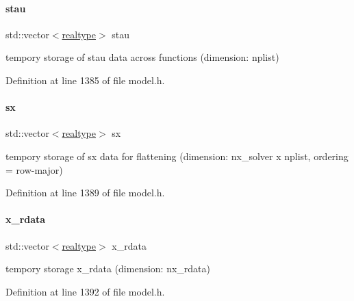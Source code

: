 \paragraph{\texorpdfstring{stau}{stau}}
{\footnotesize\ttfamily std\+::vector$<$\mbox{\hyperlink{namespaceamici_a1bdce28051d6a53868f7ccbf5f2c14a3}{realtype}}$>$ stau\hspace{0.3cm}{\ttfamily [protected]}}

tempory storage of stau data across functions (dimension\+: nplist) 

Definition at line 1385 of file model.\+h.

\mbox{\label{classamici_1_1_model_ac3288cc7f649605938f1fd1b459d3d8c}} 
\paragraph{\texorpdfstring{sx}{sx}}
{\footnotesize\ttfamily std\+::vector$<$\mbox{\hyperlink{namespaceamici_a1bdce28051d6a53868f7ccbf5f2c14a3}{realtype}}$>$ sx\hspace{0.3cm}{\ttfamily [protected]}}

tempory storage of sx data for flattening (dimension\+: nx\+\_\+solver x nplist, ordering = row-\/major) 

Definition at line 1389 of file model.\+h.

\mbox{\label{classamici_1_1_model_a297a15f378087de3c782f5af7f29510b}} 
\paragraph{\texorpdfstring{x\_rdata}{x\_rdata}}
{\footnotesize\ttfamily std\+::vector$<$\mbox{\hyperlink{namespaceamici_a1bdce28051d6a53868f7ccbf5f2c14a3}{realtype}}$>$ x\+\_\+rdata\hspace{0.3cm}{\ttfamily [protected]}}

tempory storage x\+\_\+rdata (dimension\+: nx\+\_\+rdata) 

Definition at line 1392 of file model.\+h.

\mbox{\label{classamici_1_1_model_a61ffc2a1fd9c46b5869ab4321e70d791}} 
